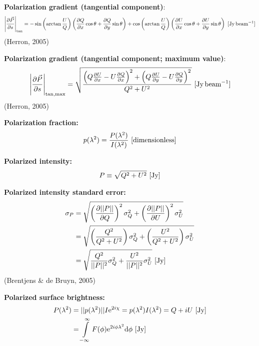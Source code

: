 \documentclass[a4paper,10pt]{article}
\begin{document}
{\noindent}\textbf{Polarization gradient (tangential component)}:
\begin{align*}
	\left\lvert\dfrac{\partial\vec{P}}{\partial s}\right\rvert_\mathrm{tan} = -\sin\left(\arctan\frac{U}{Q}\right)\left(\frac{\partial Q}{\partial x}\cos\theta+\frac{\partial Q}{\partial y}\sin\theta\right) + \cos\left(\arctan\frac{U}{Q}\right)\left(\frac{\partial U}{\partial x}\cos\theta+\frac{\partial U}{\partial y}\sin\theta\right) ~ [\rm Jy\,beam^{-1}]
\end{align*}
(Herron, 2005)

{\noindent}\textbf{Polarization gradient (tangential component; maximum value)}:
\begin{align*}
	\left\lvert\dfrac{\partial\vec{P}}{\partial s}\right\rvert_\mathrm{tan,max} = \sqrt{\frac{\left(Q\frac{\partial U}{\partial x}-U\frac{\partial Q}{\partial x}\right)^2 +\left(Q\frac{\partial U}{\partial y}-U\frac{\partial Q}{\partial y}\right)^2}{Q^2+U^2}} ~ [\rm Jy\,beam^{-1}]
\end{align*}
(Herron, 2005)

{\noindent}\textbf{Polarization fraction:}
\begin{align*}
p(\lambda^2) = \dfrac{P(\lambda^2)}{I(\lambda^2)} ~ [{\rm dimensionless}]
\end{align*}

{\noindent}\textbf{Polarized intensity:}
\begin{align*}
    P\equiv\sqrt{Q^2+U^2} ~ [\rm Jy]
\end{align*}

{\noindent}\textbf{Polarized intensity standard error:}
\begin{align*}
\sigma_P &= \sqrt{ \left(\dfrac{\partial\lvert\lvert P \rvert\rvert}{\partial Q}\right)^2\sigma_Q^2 + \left(\dfrac{\partial\lvert\lvert P \rvert\rvert}{\partial U}\right)^2\sigma_U^2 } \\
&= \sqrt{ \left(\dfrac{Q^2}{Q^2+U^2}\right)\sigma_Q^2 + \left(\dfrac{U^2}{Q^2+U^2}\right)\sigma_U^2 } \\
&= \sqrt{ \dfrac{Q^2}{\lvert\lvert P \rvert\rvert^2}\sigma_Q^2 + \dfrac{U^2}{\lvert\lvert P \rvert\rvert^2}\sigma_U^2 } ~ [\rm Jy]
\end{align*}
(Brentjens \& de Bruyn, 2005)

{\noindent}\textbf{Polarized surface brightness:}
\begin{align*}
P(\lambda^2) &= \lvert\lvert p(\lambda^2) \rvert\rvert I\mathrm{e}^{2i\chi} = p(\lambda^2)I(\lambda^2) = Q+iU ~ [\rm Jy] \\
&= \int\limits_{-\infty}^\infty F(\phi)\mathrm{e}^{2i\phi\lambda^2}\mathrm{d}\phi ~ [\rm Jy]
\end{align*}
\end{document}
